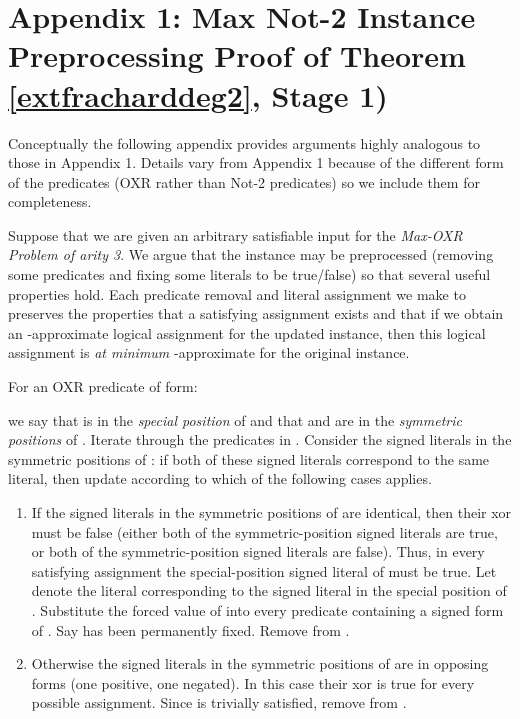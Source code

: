 \documentclass{article}
\begin{document}
\section*{Appendix 1:  Max Not-2 Instance Preprocessing \for Proof of Theorem \ref{extfracharddeg2}, Stage 1) }

Conceptually the following appendix provides arguments highly analogous to those in Appendix 1. Details vary from Appendix 1 because of the different form of the predicates (OXR rather than Not-2 predicates) so we include them for completeness.

Suppose that we are given an arbitrary satisfiable input  for the \textit{Max-OXR Problem of arity 3}. We argue that the instance may be preprocessed (removing some predicates and fixing some literals to be true/false) so that several useful properties hold.
Each predicate removal and literal assignment we make to  preserves the properties that a satisfying assignment exists and that if we obtain an -approximate logical assignment for the updated instance, then this logical assignment is \emph{at minimum} -approximate for the original instance.

For an OXR predicate of form:
\vspace{-2mm}

we say that  is in the \textit{special position} of  and that  and  are in the \textit{symmetric positions} of . Iterate through the predicates in .  Consider the signed literals in the symmetric positions of : if both of these signed literals correspond to the same literal, then update  according to which of the following cases applies.

\begin{enumerate}
\item If the signed literals in the symmetric positions of  are identical, then their xor must be false (either both of the symmetric-position signed literals are true, or both of the symmetric-position signed literals are false). Thus, in every satisfying assignment the special-position signed literal of  must be true. 
Let  denote the literal corresponding to the signed literal in the special position of . Substitute the forced value of  into every predicate containing a signed form of . Say  has been permanently fixed. Remove 
 from . 

\item Otherwise the signed literals in the symmetric positions of  are in opposing forms (one positive, one negated). In this case their xor is true for every possible assignment. Since  is trivially satisfied, remove  from .
\end{enumerate}
    
\end{document}
